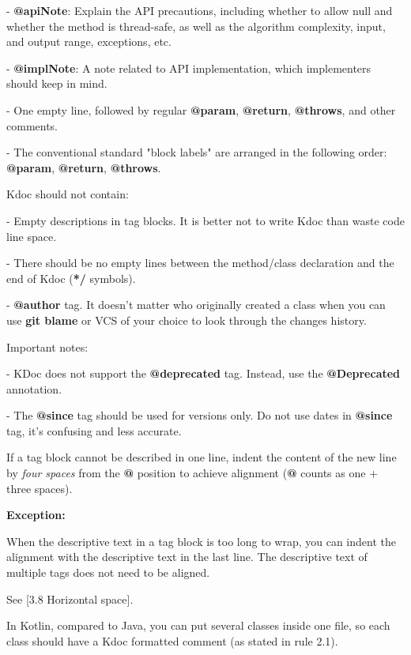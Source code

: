 - \textbf{@apiNote}: Explain the API precautions, including whether to allow null and whether the method is thread-safe, as well as the algorithm complexity, input, and output range, exceptions, etc.

- \textbf{@implNote}: A note related to API implementation, which implementers should keep in mind.

- One empty line, followed by regular \textbf{@param}, \textbf{@return}, \textbf{@throws}, and other comments.

- The conventional standard "block labels" are arranged in the following order: \textbf{@param}, \textbf{@return}, \textbf{@throws}.

Kdoc should not contain:

- Empty descriptions in tag blocks. It is better not to write Kdoc than waste code line space.

- There should be no empty lines between the method/class declaration and the end of Kdoc (\textbf{*/} symbols).

- \textbf{@author} tag. It doesn't matter who originally created a class when you can use \textbf{git blame} or VCS of your choice to look through the changes history.

Important notes:

- KDoc does not support the \textbf{@deprecated} tag. Instead, use the \textbf{@Deprecated} annotation.

- The \textbf{@since} tag should be used for versions only. Do not use dates in \textbf{@since} tag, it's confusing and less accurate.



If a tag block cannot be described in one line, indent the content of the new line by \textit{four spaces} from the \textbf{@} position to achieve alignment (\textbf{@} counts as one + three spaces).

 

\textbf{Exception:}

 

When the descriptive text in a tag block is too long to wrap, you can indent the alignment with the descriptive text in the last line. The descriptive text of multiple tags does not need to be aligned.

See [3.8 Horizontal space].



In Kotlin, compared to Java, you can put several classes inside one file, so each class should have a Kdoc formatted comment (as stated in rule 2.1).

